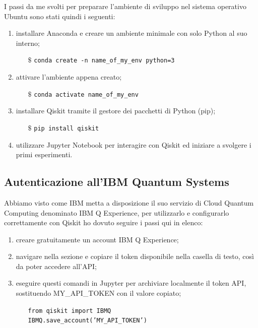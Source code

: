 I passi da me svolti per preparare l'ambiente di sviluppo nel sistema operativo Ubuntu sono stati quindi i seguenti:
\begin{enumerate}
    \item installare Anaconda e creare un ambiente minimale con solo Python al suo interno;
    \begin{itemize}
        \item[$\$$] \texttt{conda create -n name_of_my_env python=3}
    \end{itemize}
    \item attivare l'ambiente appena creato;
    \begin{itemize}
        \item[$\$$] \texttt{conda activate name_of_my_env}
    \end{itemize}
    \item installare Qiskit tramite il gestore dei pacchetti di Python (pip);
    \begin{itemize}
        \item[$\$$] \texttt{pip install qiskit}
    \end{itemize}
    \item utilizzare Jupyter Notebook per interagire con Qiskit ed iniziare a svolgere i primi esperimenti.
\end{enumerate}

\subsection{Autenticazione all'IBM Quantum Systems}
Abbiamo visto come IBM metta a disposizione il suo servizio di Cloud Quantum Computing denominato IBM Q Experience, per utilizzarlo e configurarlo correttamente con Qiskit ho dovuto seguire i passi qui in elenco:
\begin{enumerate}
    \item creare gratuitamente un account IBM Q Experience;
    \item navigare nella sezione  e copiare il token disponibile nella casella di testo, così da poter accedere all'API;
    \item eseguire questi comandi in Jupyter per archiviare localmente il token API, sostituendo MY\_API\_TOKEN con il valore copiato;
    \begin{itemize}
        \item[] \texttt{from qiskit import IBMQ} \\
                \texttt{IBMQ.save_account('MY_API_TOKEN')}
    \end{itemize}
\end{enumerate}

